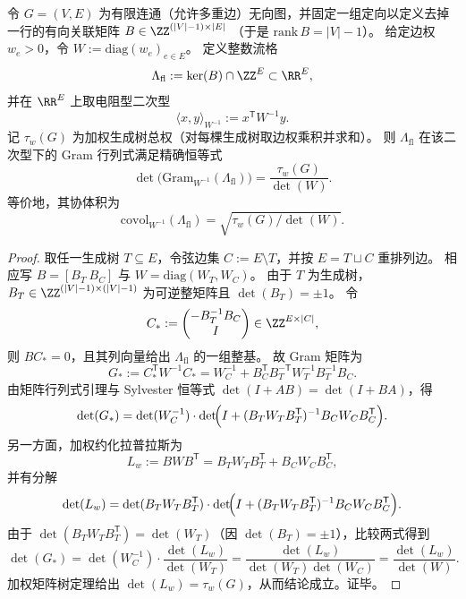 \begin{theorem}\label{thm:xi-flow-lattice-gram-determinant-tree-weight}
令 \(G=(V,E)\) 为有限连通（允许多重边）无向图，并固定一组定向以定义去掉一行的有向关联矩阵
\(
B\in\ZZ^{(|V|-1)\times|E|}
\)
（于是 \(\mathrm{rank}\,B=|V|-1\)）。
给定边权 \(w_e>0\)，令 \(W:=\mathrm{diag}(w_e)_{e\in E}\)。
定义整数流格
\[
\Lambda_{\mathrm{fl}}:=\ker(B)\cap\ZZ^{E}\subset \RR^E,
\]
并在 \(\RR^E\) 上取电阻型二次型
\[
\langle x,y\rangle_{W^{-1}}:=x^{\mathsf T}W^{-1}y.
\]
记 \(\tau_w(G)\) 为加权生成树总权（对每棵生成树取边权乘积并求和）。
则 \(\Lambda_{\mathrm{fl}}\) 在该二次型下的 Gram 行列式满足精确恒等式
\[
\det\!\bigl(\mathrm{Gram}_{W^{-1}}(\Lambda_{\mathrm{fl}})\bigr)=\frac{\tau_w(G)}{\det(W)}.
\]
等价地，其协体积为
\[
\mathrm{covol}_{W^{-1}}(\Lambda_{\mathrm{fl}})=\sqrt{\tau_w(G)/\det(W)}.
\]
\end{theorem}
\begin{proof}
取任一生成树 \(T\subseteq E\)，令弦边集 \(C:=E\setminus T\)，并按 \(E=T\sqcup C\) 重排列边。
相应写 \(B=[B_T\ B_C]\) 与 \(W=\mathrm{diag}(W_T,W_C)\)。
由于 \(T\) 为生成树，\(B_T\in\ZZ^{(|V|-1)\times(|V|-1)}\) 为可逆整矩阵且 \(\det(B_T)=\pm 1\)。
令
\[
C_*:=\begin{pmatrix}-B_T^{-1}B_C\\ I\end{pmatrix}\in\ZZ^{E\times|C|},
\]
则 \(BC_*=0\)，且其列向量给出 \(\Lambda_{\mathrm{fl}}\) 的一组整基。
故 Gram 矩阵为
\[
G_*:=C_*^{\mathsf T}W^{-1}C_*
=W_C^{-1}+B_C^{\mathsf T}B_T^{-\mathsf T}W_T^{-1}B_T^{-1}B_C.
\]
由矩阵行列式引理与 Sylvester 恒等式 \(\det(I+AB)=\det(I+BA)\)，得
\[
\det(G_*)
=\det(W_C^{-1})\cdot
\det\!\Bigl(I+(B_TW_TB_T^{\mathsf T})^{-1}B_CW_CB_C^{\mathsf T}\Bigr).
\]
另一方面，加权约化拉普拉斯为
\[
L_w:=BW B^{\mathsf T}=B_TW_TB_T^{\mathsf T}+B_CW_CB_C^{\mathsf T},
\]
并有分解
\[
\det(L_w)=\det(B_TW_TB_T^{\mathsf T})\cdot
\det\!\Bigl(I+(B_TW_TB_T^{\mathsf T})^{-1}B_CW_CB_C^{\mathsf T}\Bigr).
\]
由于 \(\det(B_TW_TB_T^{\mathsf T})=\det(W_T)\)（因 \(\det(B_T)=\pm1\)），比较两式得到
\[
\det(G_*)
=\det(W_C^{-1})\cdot\frac{\det(L_w)}{\det(W_T)}
=\frac{\det(L_w)}{\det(W_T)\det(W_C)}
=\frac{\det(L_w)}{\det(W)}.
\]
加权矩阵树定理给出 \(\det(L_w)=\tau_w(G)\)，从而结论成立。证毕。
\end{proof}

